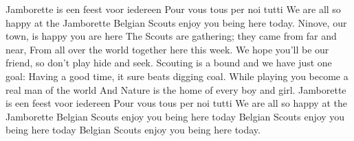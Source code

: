 \beginchorus
Jamborette is een feest voor iedereen
Pour vous tous per noi tutti
We are all so happy at the Jamborette
Belgian Scouts enjoy you being here today.
\endchorus
\beginverse
Ninove, our town, is happy you are here
The Scouts are gathering; they came from far and near,
From all over the world together here this week.
We hope you'll be our friend, so don't play hide and seek.
\endverse
\beginverse
Scouting is a bound and we have just one goal:
Having a good time, it sure beats digging coal.
While playing you become a real man of the world
And Nature is the home of every boy and girl.
\endverse
\beginverse
Jamborette is een feest voor iedereen
Pour vous tous per noi tutti
We are all so happy at the Jamborette
Belgian Scouts enjoy you being here today
Belgian Scouts enjoy you being here today
Belgian Scouts enjoy you being here today.
\endverse
\endsong